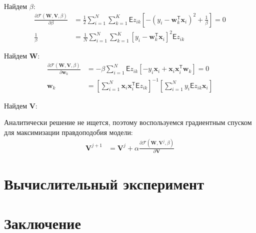 \documentclass[12pt, twoside]{article}
\numberwithin{equation}{section}
\begin{document}
Найдем $\beta$:
\begin{equation}
\label{eq:st:7}
\begin{aligned}
\frac{\partial \mathcal{F}\left(\textbf{W}, \textbf{V}, \beta\right)}{\partial \beta} &= \frac{1}{2}\sum_{i=1}^{N}\sum_{k=1}^{K}\mathsf{E}z_{ik}\left[-\left(y_i - \textbf{w}_{k}^{\mathsf{T}}\textbf{x}_i\right)^{2}+\frac{1}{\beta}\right] = 0 \\
\frac{1}{\beta} &= \frac{1}{N}\sum_{i=1}^{N}\sum_{k=1}^{K}\left[y_{i} -\textbf{w}_{k}^{\mathsf{T}}\textbf{x}_{i}\right]^{2}\mathsf{E}z_{ik}
\end{aligned}
\end{equation}

Найдем $\textbf{W}$:
\begin{equation}
\label{eq:st:8}
\begin{aligned}
\frac{\partial \mathcal{F}\left(\textbf{W}, \textbf{V}, \beta\right)}{\partial \textbf{w}_k} &= -\beta\sum_{i=1}^{N}\mathsf{E}z_{ik}\left[-y_i\textbf{x}_i+\textbf{x}_i\textbf{x}_i^{\mathsf{T}}\textbf{w}_k\right] = 0 \\
\textbf{w}_k &= \left[\sum_{i=1}^{N}\textbf{x}_i\textbf{x}_{i}^{\mathsf{T}}\mathsf{E}z_{ik}\right]^{-1}\left[\sum_{i=1}^{N}y_i\mathsf{E}z_{ik}\textbf{x}_i\right]
\end{aligned}
\end{equation}

Найдем $\textbf{V}$:

Аналитически решение не ищется, поэтому воспользуемся градиентным спуском для максимизации правдоподобия модели:
\begin{equation}
\label{eq:st:9}
\begin{aligned}
\textbf{V}^{j+1} &= \textbf{V}^{j} + \alpha\frac{\partial \mathcal{F}\left(\textbf{W}, \textbf{V}^{j}, \beta\right)}{\partial \textbf{V}} 
\end{aligned}
\end{equation}

\section{Вычислительный эксперимент}

\section{Заключение}

\begin{thebibliography}{99}

\end{thebibliography}
\end{document}
